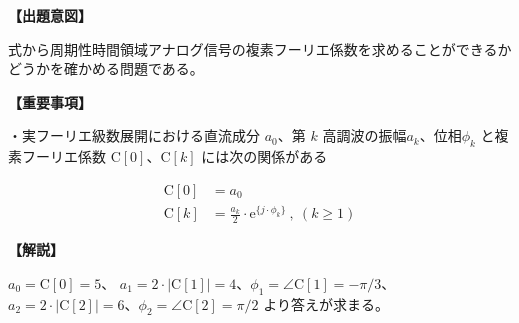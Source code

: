 \noindent \textbf{【出題意図】}

\bigskip
\noindent 式から周期性時間領域アナログ信号の複素フーリエ係数を求めることができるかどうかを確かめる問題である。

\vspace{1em}
\noindent \textbf{【重要事項】}

\medskip
\noindent・実フーリエ級数展開における直流成分 $a_0$、第 $k$ 高調波の振幅$a_k$、位相$\phi_k$ と複素フーリエ係数 $\textrm{C}[0]$、$\textrm{C}[k]$ には次の関係がある

\begin{align*}
\textrm{C}[0] &= a_0 \\
\textrm{C}[k] &= \frac{a_k}{2} \cdot \textrm{e}^{\{j \cdot \phi_k \}} \ ,\ (k\geq 1)
\end{align*}


\bigskip

\vspace{1em}
\noindent \textbf{【解説】}

\bigskip
\noindent 
$a_0 = \textrm{C}[0] = 5$、
$a_1 = 2\cdot |\textrm{C}[1]| = 4$、$\phi_1 = \angle\textrm{C}[1] = -\pi/3$、
$a_2 = 2\cdot |\textrm{C}[2]| = 6$、$\phi_2 = \angle\textrm{C}[2] =  \pi/2$
より答えが求まる。
